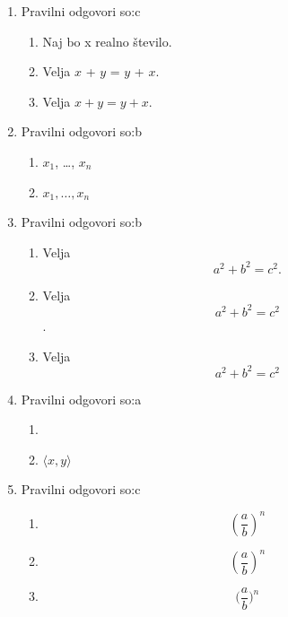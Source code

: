 \documentclass[11pt]{article}
\begin{document}
\begin{enumerate}
    \item Pravilni odgovori so:c %
    \begin{enumerate}
        \item Naj bo x realno število.
        \item Velja \(x\) + \(y\) = \(y\) + \(x\).
        \item Velja \(x + y = y + x\).
    \end{enumerate}

    \item Pravilni odgovori so:b %
    \begin{enumerate}
        \item \(x_1\), \dots, \(x_n\)
        \item \(x_1, \ldots, x_n\)
    \end{enumerate}

    \item Pravilni odgovori so:b %
    \begin{enumerate}
        \item
Velja
\[
  a^2 + b^2 = c^2.
\]
        \item
Velja
\[
  a^2 + b^2 = c^2
\]
.
        \item
Velja
\[
  a^2 + b^2 = c^2
\]
    \end{enumerate}

    \item Pravilni odgovori so:a %
    \begin{enumerate}
        \item \(<x, y>\)
        \item \(\langle x, y \rangle\)
    \end{enumerate}

    \item Pravilni odgovori so:c %
    \begin{enumerate}
        \item \[ (\frac{a}{b})^n \]
        \item \[ \left(\frac{a}{b}\right)^n \]
        \item \[ \Big(\frac{a}{b}\Big)^n \]
    \end{enumerate}


\end{enumerate}
\end{document}

